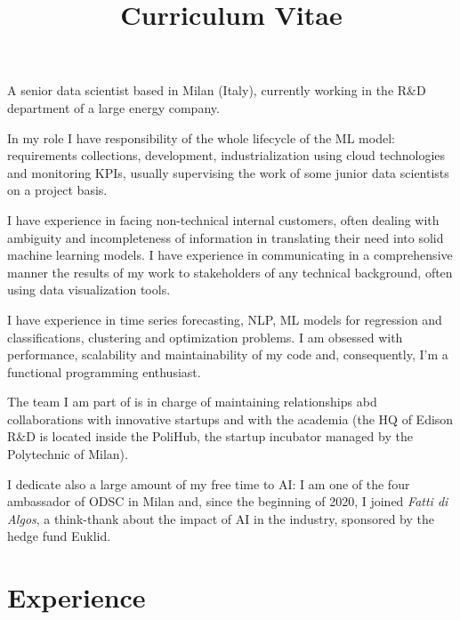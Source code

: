 \documentclass[11pt,a4paper,sans]{moderncv}        %
\title{Curriculum Vitae}                               %
\begin{document}
\makecvtitle
\small{A senior data scientist based in Milan (Italy), currently working in the R\&D department of a large energy company.

In my role I have responsibility of the whole lifecycle of the ML model: requirements collections, development, industrialization using cloud technologies and monitoring KPIs, usually supervising the work of some junior data scientists on a project basis.

I have experience in facing non-technical internal customers, often dealing with ambiguity and incompleteness of information in translating their need into solid machine learning models. I have experience in communicating in a comprehensive manner the results of my work to stakeholders of any technical background, often using data visualization tools. 

I have experience in time series forecasting, NLP,  ML models for regression and classifications, clustering and optimization problems. I am obsessed with performance, scalability and maintainability of my code and, consequently, I'm a functional programming enthusiast.  

The team I am part of is in charge of maintaining relationships abd collaborations with innovative startups and with the academia (the HQ of Edison R\&D is located inside the PoliHub, the startup incubator managed by the Polytechnic of Milan).

I dedicate also a large amount of my free time to AI: I am one of the four ambassador of ODSC in Milan and, since the beginning of 2020, I joined \emph{Fatti di Algos}, a think-thank about the impact of AI in the industry, sponsored by the hedge fund Euklid.}

\section{Experience}
\end{document}
